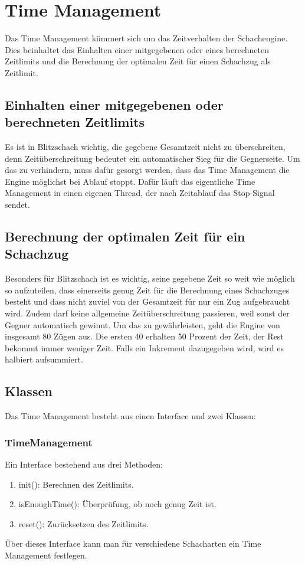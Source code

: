 \def \citeuci[#1]{\cite[l. #1]{uci}}
\section{Time Management}\label{sec:timeMan}
Das Time Management kümmert sich um das Zeitverhalten der Schachengine. Dies beinhaltet
das Einhalten einer mitgegebenen oder eines berechneten Zeitlimits und die Berechnung der optimalen Zeit für einen Schachzug als Zeitlimit.

\subsection{Einhalten einer mitgegebenen oder berechneten Zeitlimits}
Es ist in Blitzschach wichtig, die gegebene Gesamtzeit nicht zu überschreiten, denn Zeitüberschreitung bedeutet ein automatischer Sieg für die Gegnerseite. 
\newline Um das zu verhindern, muss dafür gesorgt werden, dass das Time Management die Engine möglichst bei Ablauf stoppt. Dafür läuft das eigentliche Time Management in einen eigenen Thread, der nach Zeitablauf das Stop-Signal sendet. 

\subsection{Berechnung der optimalen Zeit für ein Schachzug}
Besonders für Blitzschach ist es wichtig, seine gegebene Zeit so weit wie möglich so aufzuteilen, dass einerseits genug Zeit für die Berechnung eines Schachzuges besteht und dass nicht zuviel von der Gesamtzeit für nur ein Zug aufgebraucht wird. Zudem darf keine allgemeine Zeitüberschreitung passieren, weil sonst der Gegner automatisch gewinnt. 
\newline Um das zu gewährleisten, geht die Engine von insgesamt 80 Zügen aus. Die ersten 40 erhalten 50 Prozent der Zeit, der Rest bekommt immer weniger Zeit. Falls ein Inkrement dazugegeben wird, wird es halbiert aufsummiert. 

\subsection{Klassen}
Das Time Management besteht aus einen Interface und zwei Klassen:
\subsubsection {TimeManagement}
Ein Interface bestehend aus drei Methoden:
\begin{enumerate}
    \item{ init(): Berechnen des Zeitlimits.}
    \item{ isEnoughTime(): Überprüfung, ob noch genug Zeit ist.}
    \item{ reset(): Zurücksetzen des Zeitlimits.}
\end{enumerate}
Über dieses Interface kann man für verschiedene Schacharten ein Time Management festlegen.

